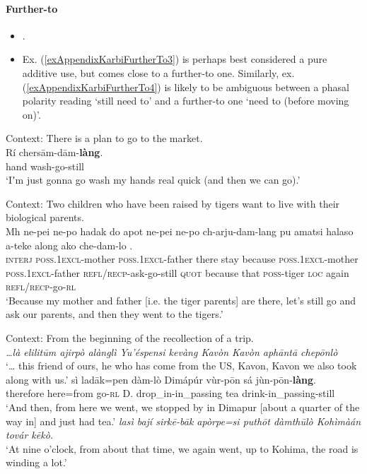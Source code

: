 \paragraph{Further-to}\label{appendixHillsKarbiFurtherTo}
\begin{itemize}
	\item \textcite[299–300]{Konnerth2014}.
	\item Ex. (\ref{exAppendixKarbiFurtherTo3}) is perhaps best considered a pure additive use, but comes close to a further-to one. Similarly, ex. (\ref{exAppendixKarbiFurtherTo4}) is likely to be ambiguous between a phasal polarity reading \lq still need to\rq{ }and a further-to one \lq need to (before moving on)\rq{}.
\end{itemize}

\begin{exe}
	\ex Context: There is a plan to go to the market.\label{exAppendixKarbiFurtherTo1}\\
	\gll Rí chersām-dām-\textbf{làng}.\\
	hand wash-go-still\\
	\glt \lq Iʼm just gonna go wash my hands real quick (and then we can go).' \parencite[299–300]{Konnerth2014}
	
	\ex Context: Two children who have been raised by tigers want to live with their biological parents.\\
	\gll Mh ne-pei ne-po hadak do apot ne-pei ne-po ch-arju-dam-lang pu amatsi halaso a-teke along ako che-dam-lo .\\
	\textsc{interj} \textsc{poss}.1\textsc{excl}-mother \textsc{poss}.1\textsc{excl}-father there stay because \textsc{poss}.1\textsc{excl}-mother \textsc{poss}.1\textsc{excl}-father \textsc{refl}/\textsc{recp}-ask-go-still \textsc{quot} because that \textsc{poss}-tiger \textsc{loc} again \textsc{refl}/\textsc{recp}-go-\textsc{rl}\\
	\glt \lq Because my mother and father [i.e. the tiger parents] are there, let’s still go and ask our parents, and then they went to the tigers.\rq{ }\parencite[154–155]{KonnerthTisso2018}
	
	\pagebreak
	\ex\label{exAppendixKarbiFurtherTo3}
	Context: From the beginning of the recollection of a trip.\\
	\textit{…là elilitūm ajirpò alànglì Yu’éspensi kevàng Kavòn Kavòn aphāntā chepōnlò}\\
	\lq … this friend of ours, he who has come from the US, Kavon, Kavon we also took along with us.'
	\exi{}\gll sì ladāk=pen dàm-lò Dimápúr vùr-pōn sá jùn-pōn-\textbf{làng}. \\
	therefore here=from go-\textsc{rl} D. drop\_in-in\_passing tea drink-in\_passing-still\\
	\glt \lq And then, from here we went, we stopped by in Dimapur [about a quarter of the way in] and just had tea.'
	\exi{}
	\textit{lasì bají sirkē-bāk apòrpe=si puthōt dàmthūlò Kohìmàán továr kēkò.}\\
	\lq At nine o’clock, from about that time, we again went, up to Kohima, the road is winding a lot.' \parencite[361–362]{KonnerthTisso2018}
	

\end{exe}
